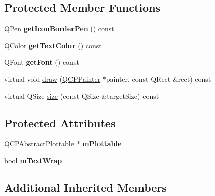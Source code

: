 \subsection*{Protected Member Functions}
\begin{DoxyCompactItemize}
\item 
\hypertarget{classQCPPlottableLegendItem_ab36270e6b022a6961fa44136f35c0e4b}{Q\-Pen {\bfseries get\-Icon\-Border\-Pen} () const }\label{classQCPPlottableLegendItem_ab36270e6b022a6961fa44136f35c0e4b}

\item 
\hypertarget{classQCPPlottableLegendItem_ad762b07439c738660ba93e78c1d03667}{Q\-Color {\bfseries get\-Text\-Color} () const }\label{classQCPPlottableLegendItem_ad762b07439c738660ba93e78c1d03667}

\item 
\hypertarget{classQCPPlottableLegendItem_a8a85c8a25affb4895423d730164d61de}{Q\-Font {\bfseries get\-Font} () const }\label{classQCPPlottableLegendItem_a8a85c8a25affb4895423d730164d61de}

\item 
virtual void \hyperlink{classQCPPlottableLegendItem_ad5f15d26b1c7e2532455528a4c3c578b}{draw} (\hyperlink{classQCPPainter}{Q\-C\-P\-Painter} $\ast$painter, const Q\-Rect \&rect) const 
\item 
virtual Q\-Size \hyperlink{classQCPPlottableLegendItem_af79ab526cc79f4ea5d9c601d139b2166}{size} (const Q\-Size \&target\-Size) const 
\end{DoxyCompactItemize}
\subsection*{Protected Attributes}
\begin{DoxyCompactItemize}
\item 
\hypertarget{classQCPPlottableLegendItem_ada647fb4b22971a1a424e15b4f6af0d9}{\hyperlink{classQCPAbstractPlottable}{Q\-C\-P\-Abstract\-Plottable} $\ast$ {\bfseries m\-Plottable}}\label{classQCPPlottableLegendItem_ada647fb4b22971a1a424e15b4f6af0d9}

\item 
\hypertarget{classQCPPlottableLegendItem_a074d2372cb8954d30ff8ad533462ce96}{bool {\bfseries m\-Text\-Wrap}}\label{classQCPPlottableLegendItem_a074d2372cb8954d30ff8ad533462ce96}

\end{DoxyCompactItemize}
\subsection*{Additional Inherited Members}



